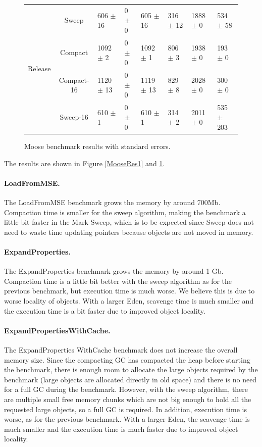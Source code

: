 \documentclass[10pt, sigplan]{acmart}
\begin{document}
\begin{figure}[thb]
\begin{tabular}{|c|c|l|l|l|l|l|l|}
   \hline
   \multirow{4}{*}{Release} 	& Sweep 		& 606 $\pm$ 16 		&	0 $\pm$ 0 	& 605 $\pm$ 16 	&316 $\pm$ 12 		& 1888 $\pm$ 0 		& 534 $\pm$ 58 \\
    				    		& Compact 	& 1092 $\pm$ 2 		&	0 $\pm$ 0 	& 1092 $\pm$ 1 	&806 $\pm$ 3 			& 1938 $\pm$ 0 		& 193 $\pm$ 0 \\
    				    & Compact-16 	& 1120 $\pm$ 13 		&	0 $\pm$ 0 		& 1119 $\pm$ 13 	&829 $\pm$ 8 			& 2028 $\pm$ 0 		& 300 $\pm$ 0 \\
    				    & Sweep-16 		& 610 $\pm$ 1 			&	0 $\pm$ 0 		& 610 $\pm$ 1 		&314 $\pm$ 2 			& 2011 $\pm$ 0 		& 535 $\pm$ 203 \\
   \hline
\end{tabular} 
\caption{Moose benchmark results with standard errors.} \label{MooseRes2}
\end{figure}

The results are shown in Figure \ref{MooseRes1} and \ref{MooseRes2}. 

\paragraph{LoadFromMSE.} The LoadFromMSE benchmark grows the memory by around 700Mb. Compaction time is smaller for the sweep algorithm, making the benchmark a little bit faster in the Mark-Sweep, which is to be expected since Sweep does not need to waste time updating pointers because objects are not moved in memory.

\paragraph{ExpandProperties.} The ExpandProperties benchmark grows the memory by around 1 Gb. Compaction time is a little bit better with the sweep algorithm as for the previous benchmark, but execution time is much worse. We believe this is due to worse locality of objects. With a larger Eden,  scavenge time is much smaller and the execution time is a bit faster due to improved object locality.

\paragraph{ExpandPropertiesWithCache.} The ExpandProperties WithCache benchmark does not increase the overall memory size. Since the compacting GC has compacted the heap before starting the benchmark, there is enough room to allocate the large objects required by the benchmark (large objects are allocated directly in old space) and there is no need for a full GC during the benchmark. However, with the sweep algorithm, there are multiple small free memory chunks which are not big enough to hold all the requested large objects, so a full GC is required. In addition, execution time is worse, as for the previous benchmark. With a larger Eden, the scavenge time is much smaller and the execution time is much faster due to improved object locality.
\end{document}
